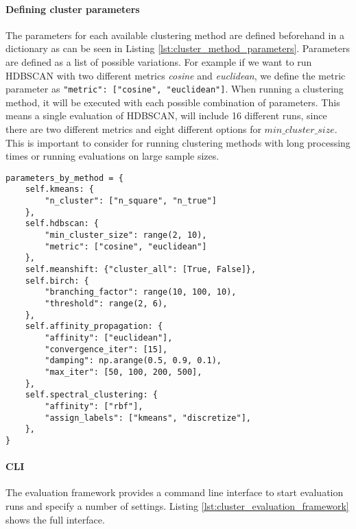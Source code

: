 \paragraph{Defining cluster parameters}
The parameters for each available clustering method are defined beforehand in a dictionary as can be seen in Listing \ref{lst:cluster_method_parameters}.
Parameters are defined as a list of possible variations.
For example if we want to run HDBSCAN with two different metrics \textit{cosine} and \textit{euclidean},
we define the metric parameter as \lstinline{"metric": ["cosine", "euclidean"]}.
When running a clustering method, it will be executed with each possible combination of parameters.
This means a single evaluation of HDBSCAN, will include 16 different runs,
since there are two different metrics and eight different options for $min\_cluster\_size$.
This is important to consider for running clustering methods with long processing times or running evaluations on large sample sizes.

\begin{lstlisting}[caption=Predefined parameters for different clustering methods,label={lst:cluster_method_parameters}]
parameters_by_method = {
    self.kmeans: {
        "n_cluster": ["n_square", "n_true"]
    },
    self.hdbscan: {
        "min_cluster_size": range(2, 10),
        "metric": ["cosine", "euclidean"]
    },
    self.meanshift: {"cluster_all": [True, False]},
    self.birch: {
        "branching_factor": range(10, 100, 10),
        "threshold": range(2, 6),
    },
    self.affinity_propagation: {
        "affinity": ["euclidean"],
        "convergence_iter": [15],
        "damping": np.arange(0.5, 0.9, 0.1),
        "max_iter": [50, 100, 200, 500],
    },
    self.spectral_clustering: {
        "affinity": ["rbf"],
        "assign_labels": ["kmeans", "discretize"],
    },
}
\end{lstlisting}

\paragraph{CLI}
The evaluation framework provides a command line interface to start evaluation runs and specify a number of settings.
Listing \ref{lst:cluster_evaluation_framework} shows the full interface.

